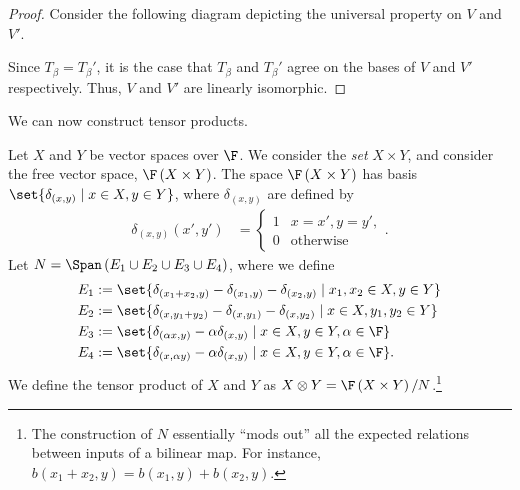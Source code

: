 \documentclass[10pt]{mypackage}
\begin{document}
\begin{proof}
  Consider the following diagram depicting the universal property on $V$ and $V'$.
  \begin{center}
  \end{center}
  Since $T_{\beta} = T_{\beta}'$, it is the case that $T_{\beta}$ and $T_{\beta}'$ agree on the bases of $V$ and $V'$ respectively. Thus, $V$ and $V'$ are linearly isomorphic.
\end{proof}
We can now construct tensor products.\newline

Let $X$ and $Y$ be vector spaces over $\F$. We consider the \textit{set} $X\times Y$, and consider the free vector space, $\F\left(X\times Y\right)$. The space $\F\left(X\times Y\right)$ has basis $\set{\delta_{\left(x,y\right)}\mid x\in X,y\in Y}$, where $\delta_{(x,y)}$ are defined by
\begin{align*}
  \delta_{(x,y)}\left(x',y'\right) &= \begin{cases}
    1 & x=x',y=y',\\
    0 & \text{otherwise}
  \end{cases}.
\end{align*}
Let $N = \Span\left(E_1\cup E_2\cup E_3\cup E_4\right)$, where we define
\begin{align*}
  E_{1} &:= \set{\delta_{\left(x_1 + x_2,y\right)} - \delta_{\left(x_1,y\right)} - \delta_{\left(x_2,y\right)}\mid x_1,x_2\in X,y\in Y}\\
  E_{2} &:= \set{\delta_{\left(x,y_1 + y_2\right)} - \delta_{\left(x,y_1\right)} - \delta_{\left(x,y_2\right)}\mid x\in X,y_1,y_2\in Y}\\
  E_{3} &:= \set{\delta_{\left(\alpha x,y\right)} - \alpha \delta_{\left(x,y\right)}\mid x\in X,y\in Y,\alpha\in \F}\\
  E_{4} &:= \set{\delta_{\left(x,\alpha y\right)} - \alpha \delta_{\left(x,y\right)}\mid x\in X,y\in Y,\alpha\in \F}.
\end{align*}
We define the tensor product of $X$ and $Y$ as $X\otimes Y = \F\left(X\times Y\right)/N$.\footnote{The construction of $N$ essentially ``mods out'' all the expected relations between inputs of a bilinear map. For instance, $b\left(x_1 + x_2,y\right) = b\left(x_1,y\right) + b\left(x_2,y\right)$.}
\end{document}
